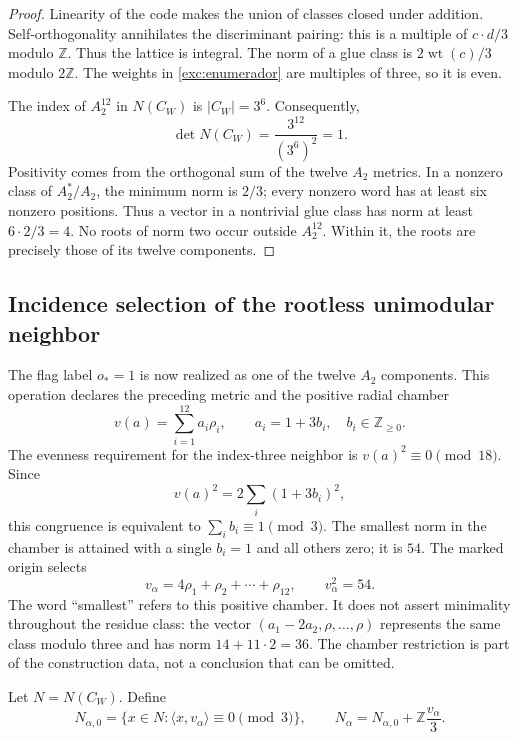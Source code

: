 \begin{proof}
Linearity of the code makes the union of classes closed under
addition. Self-orthogonality annihilates the discriminant pairing:
this is a multiple of $c\cdot d/3$ modulo $\mathbb Z$. Thus the
lattice is integral. The norm of a glue class is
$2\operatorname{wt}(c)/3$ modulo $2\mathbb Z$. The weights in
\eqref{exc:enumerador} are multiples of three, so it is even.

The index of $A_2^{12}$ in $N(C_W)$ is $|C_W|=3^6$. Consequently,
\[
 \det N(C_W)=\frac{3^{12}}{(3^6)^2}=1.
\]
Positivity comes from the orthogonal sum of the twelve $A_2$ metrics.
In a nonzero class of $A_2^*/A_2$, the minimum norm is $2/3$;
every nonzero word has at least six nonzero positions.
Thus a vector in a nontrivial glue class has norm
at least $6\cdot2/3=4$. No roots of norm two occur outside
$A_2^{12}$. Within it, the roots are precisely those of its
twelve components.
\end{proof}

\subsection{Incidence selection of the rootless unimodular neighbor}
\label{exc:leech}



The flag label $o_*=1$ is now realized as one of the
twelve $A_2$ components. This operation declares the preceding metric and
the positive radial chamber
\[
 v(a)=\sum_{i=1}^{12}a_i\rho_i,
 \qquad a_i=1+3b_i,\quad b_i\in\mathbb Z_{\geq0}.
\]
The evenness requirement for the index-three neighbor is
$v(a)^2\equiv0\pmod{18}$. Since
\[
 v(a)^2=2\sum_i(1+3b_i)^2,
\]
this congruence is equivalent to $\sum_i b_i\equiv1\pmod3$. The smallest
norm in the chamber is attained with a single $b_i=1$ and
all others zero; it is $54$. The marked origin selects
\begin{equation}
 v_\alpha=4\rho_1+\rho_2+\cdots+\rho_{12},
 \qquad v_\alpha^2=54.
 \label{exc:vector}
\end{equation}
The word ``smallest'' refers to this positive chamber. It does not assert
minimality throughout the residue class: the vector
$(a_1-2a_2,\rho,\ldots,\rho)$ represents the same class modulo three
and has norm $14+11\cdot2=36$. The chamber restriction is part
of the construction data, not a conclusion that can be omitted.

Let $N=N(C_W)$. Define
\begin{equation}
 N_{\alpha,0}=\{x\in N:\langle x,v_\alpha\rangle\equiv0\pmod3\},
 \qquad
 N_\alpha=N_{\alpha,0}+\mathbb Z\frac{v_\alpha}{3}.
 \label{exc:vecino}
\end{equation}

